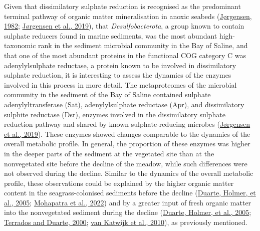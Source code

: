 \documentclass[
  12 pt,
]{book}
\begin{document}
Given that dissimilatory sulphate reduction is recognised as the predominant terminal pathway of organic matter mineralisation in anoxic seabeds (\protect\hyperlink{ref-Jorgensen1982}{Jørgensen, 1982}; \protect\hyperlink{ref-Jorgensen2019}{Jørgensen et al., 2019}), that \emph{Desulfobacterota}, a group known to contain sulphate reducers found in marine sediments, was the most abundant high-taxonomic rank in the sediment microbial community in the Bay of Saline, and that one of the most abundant proteins in the functional COG category C was adenylylsulphate reductase, a protein known to be involved in dissimilatory sulphate reduction, it is interesting to assess the dynamics of the enzymes involved in this process in more detail. The metaproteomes of the microbial community in the sediment of the Bay of Saline contained sulphate adenylyltransferase (Sat), adenylylsulphate reductase (Apr), and dissimilatory sulphite reductase (Dsr), enzymes involved in the dissimilatory sulphate reduction pathway and shared by known sulphate-reducing microbes (\protect\hyperlink{ref-Jorgensen2019}{Jørgensen et al., 2019}). These enzymes showed changes comparable to the dynamics of the overall metabolic profile. In general, the proportion of these enzymes was higher in the deeper parts of the sediment at the vegetated site than at the nonvegetated site before the decline of the meadow, while such differences were not observed during the decline. Similar to the dynamics of the overall metabolic profile, these observations could be explained by the higher organic matter content in the seagrass-colonised sediments before the decline (\protect\hyperlink{ref-Duarte2005}{Duarte, Holmer, et al., 2005}; \protect\hyperlink{ref-Mohapatra2022}{Mohapatra et al., 2022}) and by a greater input of fresh organic matter into the nonvegetated sediment during the decline (\protect\hyperlink{ref-Duarte2005}{Duarte, Holmer, et al., 2005}; \protect\hyperlink{ref-Terrados2000}{Terrados and Duarte, 2000}; \protect\hyperlink{ref-vanKatwijk2010}{van Katwijk et al., 2010}), as previously mentioned.
\end{document}
